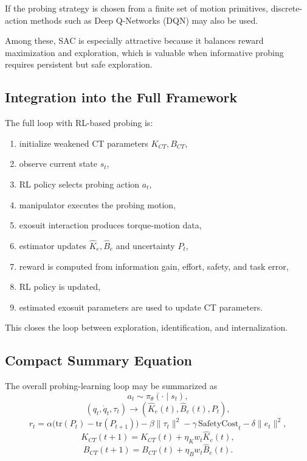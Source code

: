 \documentclass[11pt]{article}
\begin{document}
If the probing strategy is chosen from a finite set of motion primitives, discrete-action methods such as Deep Q-Networks (DQN) may also be used.

Among these, SAC is especially attractive because it balances reward maximization and exploration, which is valuable when informative probing requires persistent but safe exploration.

\subsection{Integration into the Full Framework}

The full loop with RL-based probing is:
\begin{enumerate}
    \item initialize weakened CT parameters \(K_{CT}, B_{CT}\),
    \item observe current state \(s_t\),
    \item RL policy selects probing action \(a_t\),
    \item manipulator executes the probing motion,
    \item exosuit interaction produces torque-motion data,
    \item estimator updates \(\hat{K}_e,\hat{B}_e\) and uncertainty \(P_t\),
    \item reward is computed from information gain, effort, safety, and task error,
    \item RL policy is updated,
    \item estimated exosuit parameters are used to update CT parameters.
\end{enumerate}

This closes the loop between exploration, identification, and internalization.

\subsection{Compact Summary Equation}

The overall probing-learning loop may be summarized as
\begin{equation}
a_t \sim \pi_\theta(\cdot \mid s_t),
\end{equation}
\begin{equation}
(q_t,\dot{q}_t,\tau_t) \longrightarrow (\hat{K}_e(t),\hat{B}_e(t),P_t),
\end{equation}
\begin{equation}
r_t =
\alpha \bigl(\mathrm{tr}(P_t)-\mathrm{tr}(P_{t+1})\bigr)
-\beta \|\tau_t\|^2
-\gamma\,\mathrm{SafetyCost}_t
-\delta \|e_t\|^2,
\end{equation}
\begin{equation}
K_{CT}(t+1)=K_{CT}(t)+\eta_K w_t \hat{K}_e(t),
\end{equation}
\begin{equation}
B_{CT}(t+1)=B_{CT}(t)+\eta_B w_t \hat{B}_e(t).
\end{equation}
\end{document}

